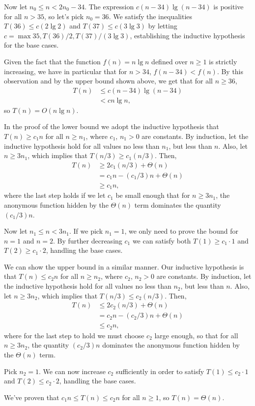 Now let $n_0\le n<2n_0-34$.
The expression $c(n-34)\lg(n-34)$ is positive for all $n>35$, so let's pick $n_0=36$.
We satisfy the inequalities $T(36)\le c(2\lg2)$ and $T(37)\le c(3\lg3)$ by letting $c=\max{35,T(36)/2,T(37)/(3\lg3)}$, establishing the inductive hypothesis for the base cases.

Given the fact that the function $f(n)=n\lg n$ defined over $n\ge1$ is strictly increasing, we have in particular that for $n>34$, $f(n-34)<f(n)$.
By this observation and by the upper bound shown above, we get that for all $n\ge36$,
\begin{align*}
    T(n) &\le c(n-34)\lg(n-34) \\
    &< cn\lg n,
\end{align*}
so $T(n)=O(n\lg n)$.

\subexercise
In the proof of the lower bound we adopt the inductive hypothesis that $T(n)\ge c_1n$ for all $n\ge n_1$, where $c_1$, $n_1>0$ are constants.
By induction, let the inductive hypothesis hold for all values no less than $n_1$, but less than $n$.
Also, let $n\ge3n_1$, which implies that $T(n/3)\ge c_1(n/3)$.
Then,
\begin{align*}
    T(n) &\ge 2c_1(n/3)+\Theta(n) \\
    &= c_1n-(c_1/3)n+\Theta(n) \\
    &\ge c_1n,
\end{align*}
where the last step holds if we let $c_1$ be small enough that for $n\ge3n_1$, the anonymous function hidden by the $\Theta(n)$ term dominates the quantity $(c_1/3)n$.

Now let $n_1\le n<3n_1$.
If we pick $n_1=1$, we only need to prove the bound for $n=1$ and $n=2$.
By further decreasing $c_1$ we can satisfy both $T(1)\ge c_1\cdot1$ and $T(2)\ge c_1\cdot2$, handling the base cases.

We can show the upper bound in a similar manner.
Our inductive hypothesis is that $T(n)\le c_2n$ for all $n\ge n_2$, where $c_2$, $n_2>0$ are constants.
By induction, let the inductive hypothesis hold for all values no less than $n_2$, but less than $n$.
Also, let $n\ge3n_2$, which implies that $T(n/3)\le c_2(n/3)$.
Then,
\begin{align*}
    T(n) &\le 2c_2(n/3)+\Theta(n) \\
    &= c_2n-(c_2/3)n+\Theta(n) \\
    &\le c_2n,
\end{align*}
where for the last step to hold we must choose $c_2$ large enough, so that for all $n\ge3n_2$, the quantity $(c_2/3)n$ dominates the anonymous function hidden by the $\Theta(n)$ term.

Pick $n_2=1$.
We can now increase $c_2$ sufficiently in order to satisfy $T(1)\le c_2\cdot1$ and $T(2)\le c_2\cdot2$, handling the base cases.

We've proven that $c_1n\le T(n)\le c_2n$ for all $n\ge1$, so $T(n)=\Theta(n)$.

\subexercise
{}
\bignegskip\bignegskip
